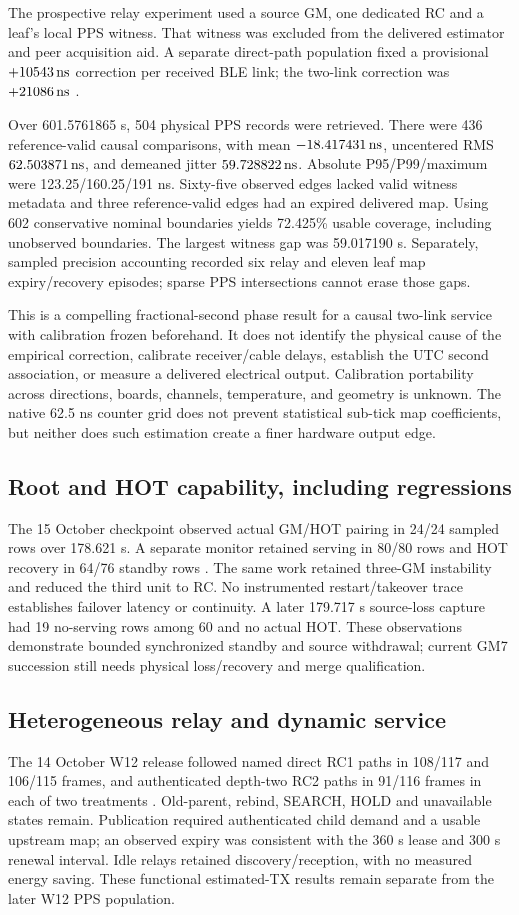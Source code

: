\documentclass[11pt,letterpaper]{article}
\begin{document}
The prospective relay experiment used a source GM, one dedicated RC and a leaf's local PPS witness. That witness was excluded from the delivered estimator and peer acquisition aid. A separate direct-path population fixed a provisional $+10543\,\mathrm{ns}$ correction per received BLE link; the two-link correction was $+21086\,\mathrm{ns}$ \cite{v14}.

Over 601.5761865 s, 504 physical PPS records were retrieved. There were 436 reference-valid causal comparisons, with mean $-18.417431\,\mathrm{ns}$, uncentered RMS $62.503871\,\mathrm{ns}$, and demeaned jitter $59.728822\,\mathrm{ns}$. Absolute P95/P99/maximum were 123.25/160.25/191 ns. Sixty-five observed edges lacked valid witness metadata and three reference-valid edges had an expired delivered map. Using 602 conservative nominal boundaries yields 72.425\% usable coverage, including unobserved boundaries. The largest witness gap was 59.017190 s. Separately, sampled precision accounting recorded six relay and eleven leaf map expiry/recovery episodes; sparse PPS intersections cannot erase those gaps.

This is a compelling fractional-second phase result for a causal two-link service with calibration frozen beforehand. It does not identify the physical cause of the empirical correction, calibrate receiver/cable delays, establish the UTC second association, or measure a delivered electrical output. Calibration portability across directions, boards, channels, temperature, and geometry is unknown. The native 62.5 ns counter grid does not prevent statistical sub-tick map coefficients, but neither does such estimation create a finer hardware output edge.

\subsection{Root and HOT capability, including regressions}
The 15 October checkpoint observed actual GM/HOT pairing in 24/24 sampled rows over 178.621 s. A separate monitor retained serving in 80/80 rows and HOT recovery in 64/76 standby rows \cite{legacy}. The same work retained three-GM instability and reduced the third unit to RC. No instrumented restart/takeover trace establishes failover latency or continuity. A later 179.717 s source-loss capture had 19 no-serving rows among 60 and no actual HOT. These observations demonstrate bounded synchronized standby and source withdrawal; current GM7 succession still needs physical loss/recovery and merge qualification.

\subsection{Heterogeneous relay and dynamic service}
The 14 October W12 release followed named direct RC1 paths in 108/117 and 106/115 frames, and authenticated depth-two RC2 paths in 91/116 frames in each of two treatments \cite{legacy}. Old-parent, rebind, SEARCH, HOLD and unavailable states remain. Publication required authenticated child demand and a usable upstream map; an observed expiry was consistent with the 360 s lease and 300 s renewal interval. Idle relays retained discovery/reception, with no measured energy saving. These functional estimated-TX results remain separate from the later W12 PPS population.
\end{document}
